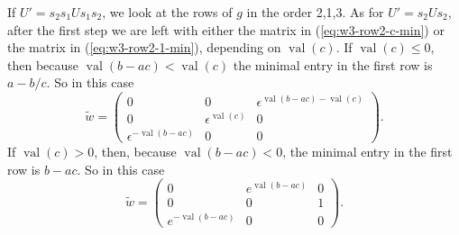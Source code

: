 \documentclass{amsart}
\theoremstyle{definition}
\def\e{\epsilon}
\def\w{\widetilde{w}}
\def\val{\mathop{\mathrm{val}}}
\begin{document}
  If $U' = s_2s_1 U s_1s_2$, we look at the rows of $g$ in the order 2,1,3.  As
  for $U' = s_2Us_2$, after the first step we are left with either the matrix
  in (\ref{eq:w3-row2-c-min}) or the matrix in (\ref{eq:w3-row2-1-min}),
  depending on $\val(c)$.  If $\val(c) \le 0$, then because $\val(b-ac) <
  \val(c)$ the minimal entry in the first row is $a-b/c$.  So in this case
  \begin{equation*}
    \w = \begin{pmatrix}
      0 & 0 & \e^{\val(b-ac) - \val(c)}\\
      0 & \e^{\val(c)} & 0 \\
      \e^{-\val(b-ac)} & 0 & 0
    \end{pmatrix}.
  \end{equation*}
  If $\val(c) > 0$, then, because $\val(b-ac) < 0$, the minimal entry in the
   first row is $b-ac$.  So in this case
  \begin{equation*}
    \w =  \begin{pmatrix}
      0 & e^{\val(b-ac)} & 0\\ 
      0 & 0 & 1 \\
      e^{-\val(b-ac)} & 0 & 0
      \end{pmatrix}.
  \end{equation*}
\end{document}
